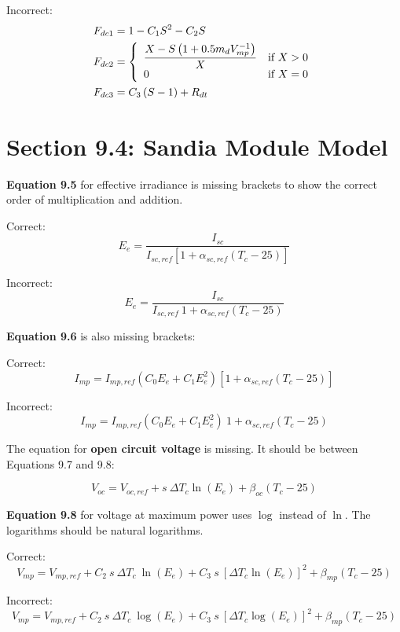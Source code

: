 \documentclass[report]{nrel}
\begin{document}
Incorrect:
\begin{align*}
F_{dc1} &= 1-C_1S^2-C_2S \notag\\ %
F_{dc2} &= 
\left\{
   \begin{array}{ll}
      \dfrac{X-S\left(1+0.5 m_d V^{-1}_{mp}\right)}{X} & \text{if $X>0$}\\
      0 & \text{if $X=0$}\\
   \end{array}
\right. \notag\\ %
F_{dc3} &= C_3\left(S-1\right)+R_{dt} %
\end{align*}

\section*{Section 9.4: Sandia Module Model}

\textbf{Equation 9.5} for effective irradiance is missing brackets to show the correct order of multiplication and addition.

Correct:
\begin{equation*}
E_e = \frac{I_{sc}}{I_{sc,ref} \left[1 + \alpha_{sc,ref} (T_c - 25)\right]}
\end{equation*}

Incorrect:
\begin{equation*}
E_e = \frac{I_{sc}}{I_{sc,ref}~1 + \alpha_{sc,ref} (T_c - 25)}
\end{equation*}

\textbf{Equation 9.6} is also missing brackets:

Correct:
\begin{equation*}
I_{mp} = I_{mp,ref} (C_0 E_e + C_1 E_e^2) \left[1 + \alpha_{sc,ref} (T_c - 25)\right]
\end{equation*}

Incorrect:
\begin{equation*}
I_{mp} = I_{mp,ref} (C_0 E_e + C_1 E_e^2)~1 + \alpha_{sc,ref} (T_c - 25)
\end{equation*}

The equation for \textbf{open circuit voltage} is missing. It should be between Equations 9.7 and 9.8:

\begin{equation*}
V_{oc} = V_{oc,ref}+ s~\Delta T_c \ln(E_e)+ \beta_{oc} (T_c - 25)
\end{equation*}

\textbf{Equation 9.8} for voltage at maximum power uses $\log$ instead of $\ln$. The logarithms  should be natural logarithms.

Correct:
\begin{equation*}
V_{mp} = V_{mp,ref} +
 C_2~s~\Delta T_c~\ln(E_e) +
 C_3~s~\left[\Delta T_c \ln(E_e)\right]^2 +
 \beta_{mp} (T_c - 25)
\end{equation*}

Incorrect:
\begin{equation*}
V_{mp} = V_{mp,ref} +
 C_2~s~\Delta T_c~\log(E_e) +
 C_3~s~\left[\Delta T_c \log(E_e)\right]^2 +
 \beta_{mp} (T_c - 25)
\end{equation*}
\end{document}
